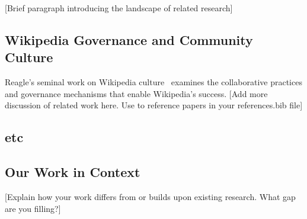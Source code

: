
\label{sec:related}

[Brief paragraph introducing the landscape of related research]

\subsection{Wikipedia Governance and Community Culture}

Reagle's seminal work on Wikipedia culture~\cite{reagle2010good} examines the collaborative practices and governance mechanisms that enable Wikipedia's success. [Add more discussion of related work here. Use \cite{} to reference papers in your references.bib file]

\subsection{etc}


\subsection{Our Work in Context}

[Explain how your work differs from or builds upon existing research. What gap are you filling?]

